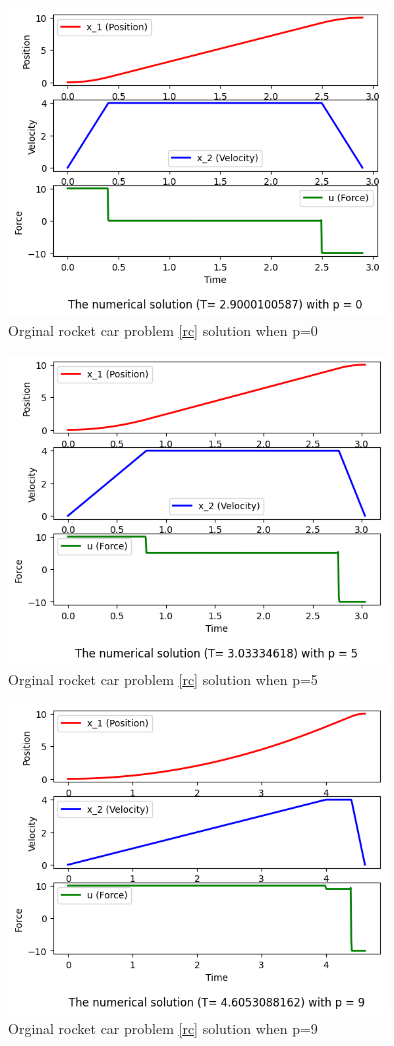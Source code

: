 \documentclass  [
  paper    = a4,
  BCOR     = 10mm,
  twoside,
  fontsize = 12pt,
  fleqn,
  toc      = bibnumbered,
  toc      = listofnumbered,
  numbers  = noendperiod,
  headings = normal,
  listof   = leveldown,
  version  = 3.03
]                                       {scrreprt}
\newcommand{\<}{\langle}
\renewcommand{\>}{\rangle}
\begin{document}
\begin{figure}[H]
	\centerline{\includegraphics[width=10cm]{original_u10_p0.png}}
	\caption{Orginal rocket car problem \ref{rc} solution when p=0}
	\label{fig1_org_u10_p0}
\end{figure}

\begin{figure}[H]
	\centerline{\includegraphics[width=10cm]{original_u10_p5.png}}
	\caption{Orginal rocket car problem \ref{rc} solution when p=5}
	\label{fig1_org_u10_p5}
\end{figure}

\begin{figure}[H]
	\centerline{\includegraphics[width=10cm]{original_u10_p9.png}}
	\caption{Orginal rocket car problem \ref{rc} solution when p=9}
	\label{fig1_org_u10_p9}
\end{figure}
\end{document}
